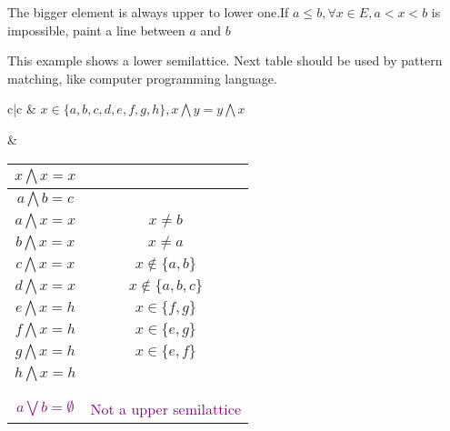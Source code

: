\begin{Sym}
    The bigger element is always upper to lower one.If $a\leq b, \forall x\in E, a<x<b$ is impossible, paint a line between $a$ and $b$
    \begin{center}
    \end{center}

    This example shows a lower semilattice. Next table should be used by pattern matching, like computer programming language.
    \begin{center}
        \begin{tabular}{c|c}
        & $x\in \{a,b,c,d,e,f,g,h\}, x \bigwedge y = y \bigwedge x$    \\
        &
        \begin{tabular}{c|c} \hline
            $x \bigwedge x = x$ & \\ \hline
            $a \bigwedge b = c$ & \\ \hline
            $a \bigwedge x = x$ & $x \neq b$    \\ \hline
            $b \bigwedge x = x$ & $x \neq a$    \\ \hline
            $c \bigwedge x = x$ & $x \notin \{a,b\}$ \\ \hline
            $d \bigwedge x = x$ & $x \notin \{a,b,c\}$ \\ \hline
            $e \bigwedge x = h$ & $x \in \{f, g\}$ \\ \hline
            $f \bigwedge x = h$ & $x \in \{e, g\}$ \\ \hline
            $g \bigwedge x = h$ & $x \in \{e, f\}$ \\ \hline
            $h \bigwedge x = h$ & \\ \hline
            & \\
            & \\ \hline
            \textcolor{purple}{$a \bigvee b = \emptyset$} & \textcolor{purple}{Not a upper semilattice} \\ \hline
        \end{tabular}
    \end{tabular}
    \end{center}
\end{Sym}

